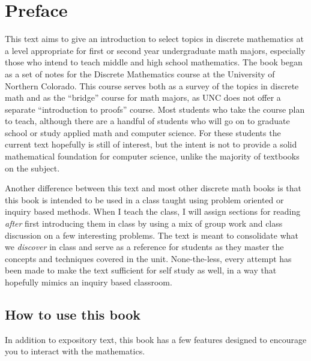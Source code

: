 
\chapter{Preface}

This text aims to give an introduction to select topics in discrete mathematics at a level appropriate for first or second year undergraduate math majors, especially those who intend to teach middle and high school mathematics.  The book began as a set of notes for the Discrete Mathematics course at the University of Northern Colorado.  This course serves both as a survey of the topics in discrete math and as the ``bridge'' course for math majors, as UNC does not offer a separate ``introduction to proofs'' course.  Most students who take the course plan to teach, although there are a handful of students who will go on to graduate school or study applied math and computer science.  For these students the current text hopefully is still of interest, but the intent is not to provide a solid mathematical foundation for computer science, unlike the majority of textbooks on the subject.

Another difference between this text and most other discrete math books is that this book is intended to be used in a class taught using problem oriented or inquiry based methods.  When I teach the class, I will assign sections for reading \emph{after} first introducing them in class by using a mix of group work and class discussion on a few interesting problems.  The text is meant to consolidate what we \emph{discover} in class and serve as a reference for students as they master the concepts and techniques covered in the unit.  None-the-less, every attempt has been made to make the text sufficient for self study as well, in a way that hopefully mimics an inquiry based classroom.


\section*{How to use this book}

In addition to expository text, this book has a few features designed to encourage you to interact with the mathematics.

